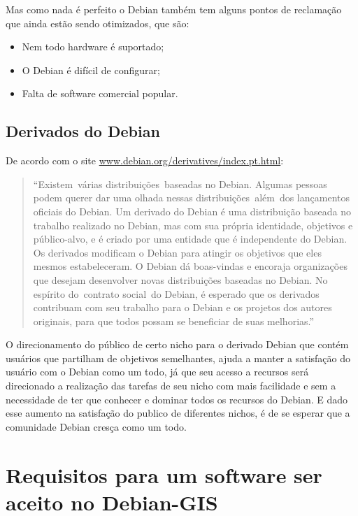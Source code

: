 Mas como nada é perfeito o Debian também tem alguns pontos de reclamação que ainda estão sendo otimizados, que são:

\begin{itemize}
	\item Nem todo hardware é suportado;
	\item O Debian é difícil de configurar;
	\item Falta de software comercial popular.

\end{itemize}

\subsection{Derivados do Debian}

De acordo com o site \url{www.debian.org/derivatives/index.pt.html}: 

\begin{quote}
	``Existem várias distribuições baseadas no Debian. Algumas pessoas podem querer dar uma olhada nessas distribuições além dos lançamentos oficiais do Debian. Um derivado do Debian é uma distribuição baseada no trabalho realizado no Debian, mas com sua própria identidade, objetivos e público-alvo, e é criado por uma entidade que é independente do Debian. Os derivados modificam o Debian para atingir os objetivos que eles mesmos estabeleceram. O Debian dá boas-vindas e encoraja organizações que desejam desenvolver novas distribuições baseadas no Debian. No espírito do contrato social do Debian, é esperado que os derivados contribuam com seu trabalho para o Debian e os projetos dos autores originais, para que todos possam se beneficiar de suas melhorias.''
\end{quote}

O direcionamento do público de certo nicho para o derivado Debian que contém usuários que partilham de objetivos semelhantes, ajuda a manter a satisfação do usuário com o Debian como um todo, já que seu acesso a recursos será direcionado a realização das tarefas de seu nicho com mais facilidade e sem a necessidade de ter que conhecer e dominar todos os recursos do Debian. E dado esse aumento na satisfação do publico de diferentes nichos, é de se esperar que a comunidade Debian cresça como um todo.

\section{Requisitos para um software ser aceito no Debian-GIS}

